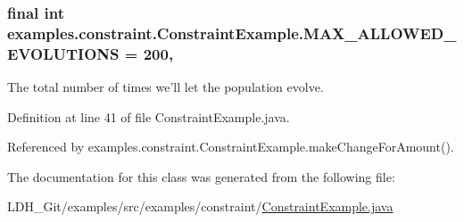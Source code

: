 \hypertarget{classexamples_1_1constraint_1_1_constraint_example_a85391474e821d68581bf3f8e0c88808c}{
\subsubsection[{M\-A\-X\-\_\-\-A\-L\-L\-O\-W\-E\-D\-\_\-\-E\-V\-O\-L\-U\-T\-I\-O\-N\-S}]{\setlength{\rightskip}{0pt plus 5cm}final int examples.\-constraint.\-Constraint\-Example.\-M\-A\-X\-\_\-\-A\-L\-L\-O\-W\-E\-D\-\_\-\-E\-V\-O\-L\-U\-T\-I\-O\-N\-S = 200\hspace{0.3cm}{\ttfamily [static]}, {\ttfamily [private]}}}\label{classexamples_1_1constraint_1_1_constraint_example_a85391474e821d68581bf3f8e0c88808c}
The total number of times we'll let the population evolve. 

Definition at line 41 of file Constraint\-Example.\-java.



Referenced by examples.\-constraint.\-Constraint\-Example.\-make\-Change\-For\-Amount().



The documentation for this class was generated from the following file\-:\begin{DoxyCompactItemize}
\item 
L\-D\-H\-\_\-\-Git/examples/src/examples/constraint/\hyperlink{_constraint_example_8java}{Constraint\-Example.\-java}\end{DoxyCompactItemize}
